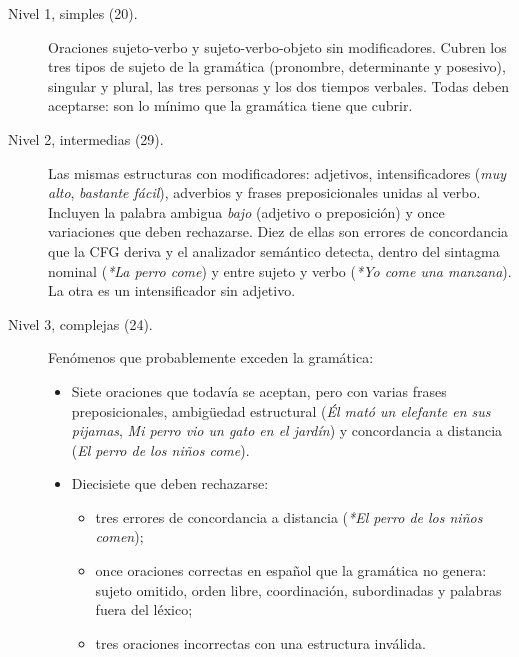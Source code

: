 \begin{description}
  \item[Nivel 1, simples (20).] Oraciones sujeto-verbo y sujeto-verbo-objeto sin
    modificadores. Cubren los tres tipos de sujeto de la gramática (pronombre, determinante y
    posesivo), singular y plural, las tres personas y los dos tiempos verbales. Todas deben
    aceptarse: son lo mínimo que la gramática tiene que cubrir.
  \item[Nivel 2, intermedias (29).] Las mismas estructuras con modificadores: adjetivos,
    intensificadores (\emph{muy alto}, \emph{bastante fácil}), adverbios y frases
    preposicionales unidas al verbo. Incluyen la palabra ambigua \emph{bajo} (adjetivo o
    preposición) y once variaciones que deben rechazarse. Diez de ellas son errores de
    concordancia que la CFG deriva y el analizador semántico detecta, dentro del sintagma
    nominal (\emph{*La perro come}) y entre sujeto y verbo (\emph{*Yo come una manzana}). La
    otra es un intensificador sin adjetivo.
  \item[Nivel 3, complejas (24).] Fenómenos que probablemente exceden la gramática:
    \begin{itemize}
      \item Siete oraciones que todavía se aceptan, pero con varias frases preposicionales,
        ambigüedad estructural (\emph{Él mató un elefante en sus pijamas}, \emph{Mi perro vio un
        gato en el jardín}) y concordancia a distancia (\emph{El perro de los niños come}).
      \item Diecisiete que deben rechazarse:
        \begin{itemize}
          \item tres errores de concordancia a distancia (\emph{*El perro de los niños comen});
          \item once oraciones correctas en español que la gramática no genera: sujeto omitido,
            orden libre, coordinación, subordinadas y palabras fuera del léxico;
          \item tres oraciones incorrectas con una estructura inválida.
        \end{itemize}
    \end{itemize}
\end{description}

\begin{table}[h]
  \centering
  \small
  \caption{Composición del conjunto de prueba.}
  \label{tab:set_de_prueba}
\end{table}

